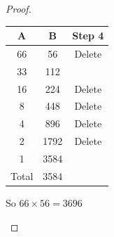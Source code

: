 \documentclass[a4paper]{article}
\begin{document}
\begin{eg}
\begin{proof}
\begin{centering}
\begin{enumerate}
\begin{tabular}{|c|c|c|}
					      \hline
					      A     & B    & Step 4 \\
					      \hline
					      66    & 56   & Delete \\
					      \hline
					      33    & 112  &        \\
					      \hline
					      16    & 224  & Delete \\
					      \hline
					      8     & 448  & Delete \\
					      \hline
					      4     & 896  & Delete \\
					      \hline
					      2     & 1792 & Delete \\
					      \hline
					      1     & 3584 &        \\
					      \hline
					      Total & 3584 &        \\
					      \hline
				      \end{tabular}
				      So $66\times56=3696$
			\end{enumerate}
		\end{centering}
	\end{proof}
\end{eg}
\end{document}

